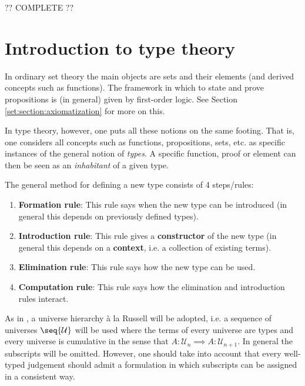     ?? COMPLETE ??

\section{Introduction to type theory}

    In ordinary set theory the main objects are sets and their elements (and derived concepts such as functions). The framework in which to state and prove propositions is (in general) given by first-order logic. See Section \ref{set:section:axiomatization} for more on this.

    In type theory, however, one puts all these notions on the same footing. That is, one considers all concepts such as functions, propositions, sets, etc. as specific instances of the general notion of \textit{types}. A specific function, proof or element can then be seen as an \textit{inhabitant} of a given type.

    \begin{method}
        The general method for defining a new type consists of 4 steps/rules:
        \begin{enumerate}
            \item \textbf{Formation rule}: This rule says when the new type can be introduced (in general this depends on previously defined types).
            \item \textbf{Introduction rule}: This rule gives a \textbf{constructor} of the new type (in general this depends on a \textbf{context}, i.e. a collection of existing terms).
            \item \textbf{Elimination rule}: This rule says how the new type can be used.
            \item \textbf{Computation rule}: This rule says how the elimination and introduction rules interact.
        \end{enumerate}
    \end{method}

    As in \cite{hott}, a universe hierarchy \`a la Russell will be adopted, i.e. a sequence of universes $\seq{\mathcal{U}}$ will be used where the terms of every universe are types and every universe is cumulative in the sense that $A:\mathcal{U}_n\implies A:\mathcal{U}_{n+1}$. In general the subscripts will be omitted. However, one should take into account that every well-typed judgement should admit a formulation in which subscripts can be assigned in a consistent way.


